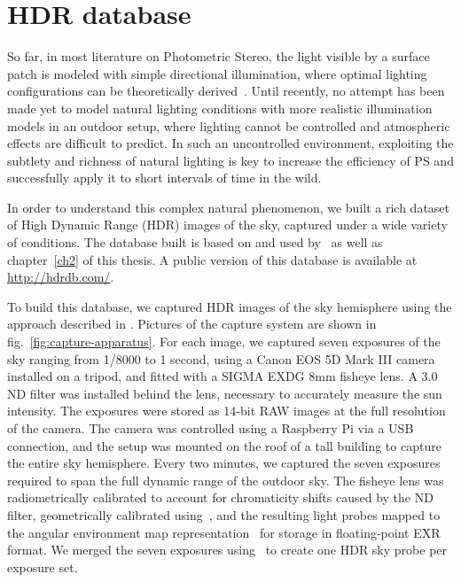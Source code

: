 \section{HDR database}
\label{sec:hdrdb}


So far, in most literature on Photometric Stereo, the light visible by a surface patch is modeled with simple directional illumination, where optimal lighting configurations can be theoretically derived~\cite{drbohlav-iccv-05,klaudiny-prl-14,shen-pg-14}. Until recently, no attempt has been made yet to model natural lighting conditions with more realistic illumination models in an outdoor setup, where lighting cannot be controlled and atmospheric effects are difficult to predict. In such an uncontrolled environment, exploiting the subtlety and richness of natural lighting is key to increase the efficiency of PS and successfully apply it to short intervals of time in the wild.

In order to understand this complex natural phenomenon, we built a rich dataset of High Dynamic Range (HDR) images of the sky, captured under a wide variety of conditions. The database built is based on and used by~\cite{lalonde-3dv-14,holdgeoffroy-iccp-15,holdgeoffroy-3dv-15} as well as chapter~\ref{ch2} of this thesis. A public version of this database is available at \url{http://hdrdb.com/}.

To build this database, we captured HDR images of the sky hemisphere using the approach described in \cite{stumpfel-afrigraph-04}. Pictures of the capture system are shown in fig.~\ref{fig:capture-apparatus}. For each image, we captured seven exposures of the sky ranging from 1/8000 to 1 second, using a Canon EOS 5D Mark III camera installed on a tripod, and fitted with a SIGMA EXDG 8mm fisheye lens. A 3.0 ND filter was installed behind the lens, necessary to accurately measure the sun intensity. The exposures were stored as 14-bit RAW images at the full resolution of the camera. The camera was controlled using a Raspberry Pi via a USB connection, and the setup was mounted on the roof of a tall building to capture the entire sky hemisphere. Every two minutes, we captured the seven exposures required to span the full dynamic range of the outdoor sky. The fisheye lens was radiometrically calibrated to account for chromaticity shifts caused by the ND filter, geometrically calibrated using~\cite{scaramuzza-iros-06}, and the resulting light probes mapped to the angular environment map representation~\cite{reinhard-book-05} for storage in floating-point EXR format. We merged the seven exposures using~\cite{debevec-siggraph-97} to create one HDR sky probe per exposure set.

